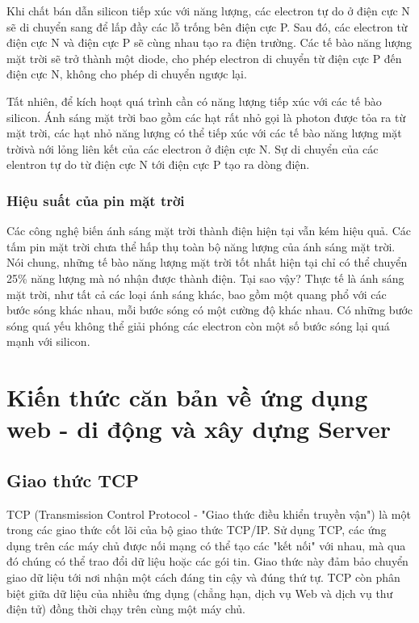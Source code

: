 Khi chất bán dẫn silicon tiếp xúc với năng lượng, các electron tự do ở điện cực N sẽ di chuyển sang để lấp đầy các lỗ trống bên điện cực P. Sau đó, các electron từ điện cực N và điện cực P sẽ cùng nhau tạo ra điện trường. Các tế bào năng lượng mặt trời sẽ trở thành một diode, cho phép electron di chuyển từ điện cực P đến điện cực N, không cho phép di chuyển ngược lại.

Tất nhiên, để kích hoạt quá trình cần có năng lượng tiếp xúc với các tế bào silicon. Ánh sáng mặt trời bao gồm các hạt rất nhỏ gọi là photon được tỏa ra từ mặt trời, các hạt nhỏ năng lượng có thể tiếp xúc với các tế bào năng lượng mặt trờivà nới lỏng liên kết của các electron ở điện cực N. Sự di chuyển của các elentron tự do từ điện cực N tới điện cực P tạo ra dòng điện.





\subsubsection*{Hiệu suất của pin mặt trời}
Các công nghệ biến ánh sáng mặt trời thành điện hiện tại vẫn kém hiệu quả. Các tấm pin mặt trời chưa thể hấp thụ toàn bộ năng lượng của ánh sáng mặt trời. Nói chung, những tế bào năng lượng mặt trời tốt nhất hiện tại chỉ có thể chuyển 25\% năng lượng mà nó nhận được thành điện. Tại sao vậy? Thực tế là ánh sáng mặt trời, như tất cả các loại ánh sáng khác, bao gồm một quang phổ với các bước sóng khác nhau, mỗi bước sóng có một cường độ khác nhau. Có những bước sóng quá yếu không thể giải phóng các electron còn một số bước sóng lại quá mạnh với silicon.



\section{Kiến thức căn bản về ứng dụng web - di động và xây dựng Server}

\subsection{Giao thức TCP}
TCP (Transmission Control Protocol - "Giao thức điều khiển truyền vận") là một trong các giao thức cốt lõi của bộ giao thức TCP/IP. Sử dụng TCP, các ứng dụng trên các máy chủ được nối mạng có thể tạo các "kết nối" với nhau, mà qua đó chúng có thể trao đổi dữ liệu hoặc các gói tin. Giao thức này đảm bảo chuyển giao dữ liệu tới nơi nhận một cách đáng tin cậy và đúng thứ tự. TCP còn phân biệt giữa dữ liệu của nhiều ứng dụng (chẳng hạn, dịch vụ Web và dịch vụ thư điện tử) đồng thời chạy trên cùng một máy chủ.

